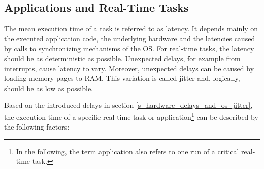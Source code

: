 \subsection{Applications and Real-Time Tasks}
The mean execution time of a task is referred to as latency.
It depends mainly on the executed application code, the underlying hardware and the latencies caused by calls to synchronizing mechanisms of the \ac{OS}. 
For real-time tasks, the latency should be as deterministic as possible.
Unexpected delays, for example from interrupts, cause latency to vary.
Moreover, unexpected delays can be caused by loading memory pages to \ac{RAM}.
This variation is called jitter and, logically, should be as low as possible. 
\par
Based on the introduced delays in section \ref{s_hardware_delays_and_os_jitter}, the execution time of a specific real-time task or application\footnote{In the following, the term application also refers to one run of a critical real-time task.} can be described by the following factors:

